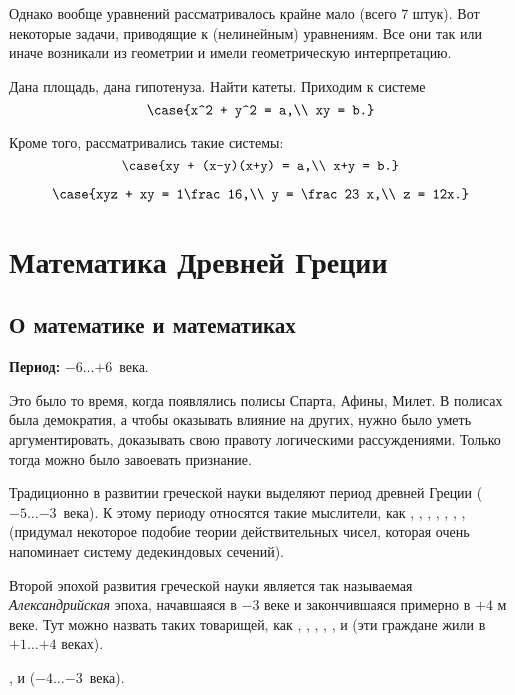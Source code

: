 \documentclass[a4paper,oneside,fleqn,10pt]{article}
\newcommand{\pe}[2]{${#1}\ldots{#2}$}
\begin{document}
Однако вообще уравнений рассматривалось крайне мало (всего $7$ штук).
Вот некоторые задачи, приводящие к (нелинейным) уравнениям. Все они так или
иначе возникали из геометрии и имели геометрическую интерпретацию.

Дана площадь, дана гипотенуза. Найти катеты. Приходим к системе
$$\case{x^2 + y^2 = a,\\ xy = b.}$$

Кроме того, рассматривались такие системы:
$$\case{xy + (x-y)(x+y) = a,\\
x+y = b.}$$

$$\case{xyz + xy = 1\frac16,\\
y = \frac23 x,\\
z = 12x.}$$


\section{Математика Древней Греции}

\subsection{О математике и математиках}

\textbf{Период:} \pe{-6}{+6}~века.

Это было то время, когда появлялись полисы Спарта, Афины, Милет.
В полисах была демократия, а чтобы оказывать влияние на других,
нужно было уметь аргументировать, доказывать свою правоту логическими
рассуждениями. Только тогда можно было завоевать признание.

Традиционно в развитии греческой науки выделяют
период древней Греции (\pe{-5}{-3}~века).
К этому периоду относятся такие мыслители, как ,
, , , , , , 
(придумал некоторое подобие теории действительных чисел, которая очень напоминает
систему дедекиндовых сечений).

Второй эпохой развития греческой науки является так называемая \emph{Александрийская} эпоха,
начавшаяся в $-3$ веке и закончившаяся примерно в $+4$ м веке.
Тут можно назвать таких товарищей, как , , ,
, ,  и 
(эти граждане жили в \pe{+1}{+4} веках).

,  и  (\pe{-4}{-3}~века).
\end{document}

